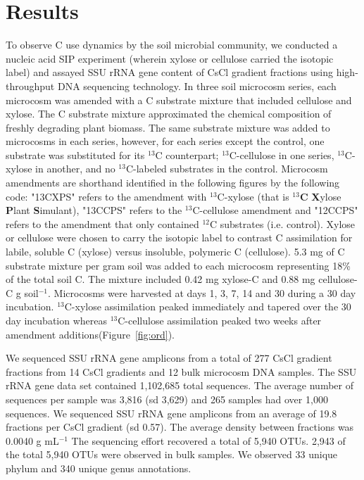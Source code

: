 \section{Results}
To observe C use dynamics by the soil microbial community, we conducted a
nucleic acid SIP experiment (wherein xylose or cellulose carried the isotopic
label) and assayed SSU rRNA gene content of CsCl gradient fractions using
high-throughput DNA sequencing technology. In three soil microcosm
series, each microcosm was amended with a C substrate mixture
that included cellulose and xylose. The C substrate mixture approximated
the chemical composition of freshly degrading plant biomass. The same substrate mixture was added to microcosms in each series, however, for each series except the control, one
substrate was substituted for its $^{13}$C counterpart; $^{13}$C-cellulose in one series, $^{13}$C-xylose in another, and no $^{13}$C-labeled substrates in the control. Microcosm amendments are shorthand identified in the following figures by the following code: "13CXPS" refers to the amendment with $^{13}$C-xylose (that is $^{13}$\textbf{C} \textbf{X}ylose
\textbf{P}lant \textbf{S}imulant), "13CCPS" refers to the $^{13}$C-cellulose amendment and "12CCPS" refers to the amendment that only contained $^{12}$C substrates (i.e. control). Xylose or cellulose were chosen to carry the isotopic label to contrast C assimilation for labile, soluble C (xylose) versus insoluble, polymeric C (cellulose).  5.3 mg of C substrate mixture per gram soil was added to each microcosm representing 18\% of the total soil C. The mixture included
0.42 mg xylose-C and 0.88 mg cellulose-C g soil$^{-1}$.  Microcosms were harvested at days 1, 3, 7, 14 and 30  during a 30 day incubation. $^{13}$C-xylose assimilation peaked immediately and tapered over the 30 day incubation whereas $^{13}$C-cellulose assimilation peaked two weeks after amendment additions(Figure~\ref{fig:ord}).

We sequenced SSU rRNA gene amplicons from a total of 277 CsCl gradient
fractions from 14 CsCl gradients and 12 bulk microcosm DNA samples. The SSU
rRNA gene data set contained 1,102,685 total sequences. The average number of
sequences per sample was 3,816 (sd 3,629) and 265 samples had over 1,000
sequences. We sequenced SSU rRNA gene amplicons from an average of 19.8
fractions per CsCl gradient (sd 0.57). The average density between fractions
was  0.0040 g mL$^{-1}$ The sequencing effort recovered a total of 5,940 OTUs.
2,943 of the total 5,940 OTUs were observed in bulk samples. We observed 33
unique phylum and 340 unique genus annotations.

